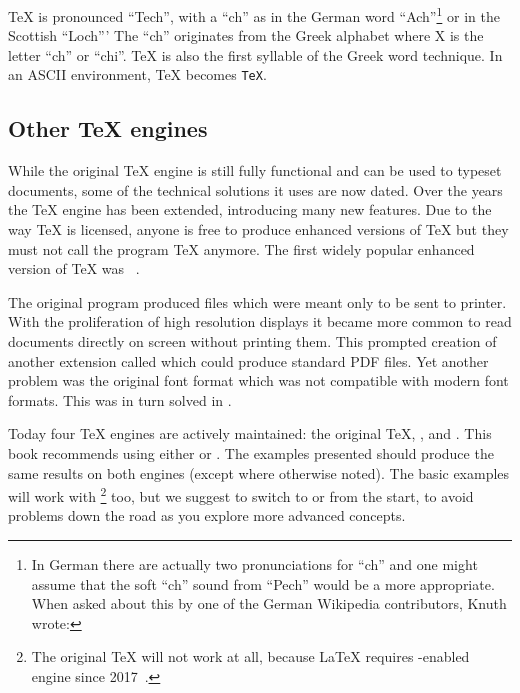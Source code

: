 \TeX{} is pronounced \enquote{Tech}, with a \enquote{ch} as in the German word
\enquote{Ach}\footnote{In German there are actually two pronunciations for
  \enquote{ch} and one might assume that the soft \enquote{ch} sound from
  \enquote{Pech} would be a more appropriate. When asked about this by one of the
  German Wikipedia contributors, Knuth wrote:
  } or in the
Scottish \enquote{Loch}' The \enquote{ch} originates from the Greek alphabet
where X is the letter \enquote{ch} or \enquote{chi}. \TeX{} is also the first
syllable of the Greek word technique. In an ASCII environment, \TeX{} becomes
\texttt{TeX}.

\subsection{Other \TeX{} engines}

While the original \TeX{} engine is still fully functional and can be used to
typeset documents, some of the technical solutions it uses are now dated. Over
the years the \TeX{} engine has been extended, introducing many new features.
Due to the way \TeX{} is licensed, anyone is free to produce enhanced versions
of \TeX{} but they must not call the program \TeX{} anymore. The first widely
popular enhanced version of \TeX{} was ~\cite{etex}.

The original program produced  files which were meant only to be sent
to printer. With the proliferation of high resolution displays it became more
common to read documents directly on screen without printing them. This
prompted creation of another extension called  which could
produce standard PDF files. Yet another problem was the original font format
which was not compatible with modern font formats. This was in turn solved in
.

Today four \TeX{} engines are actively maintained: the original \TeX{},
,  and . This book recommends using
either  or . The examples presented should produce
the same results on both engines (except where otherwise noted). The basic
examples will work with \footnote{The original \TeX{} will not
  work at all, because \LaTeX{} requires -enabled engine since
  2017~\cite{etex-kernel}.} too, but we suggest to switch to  or
 from the start, to avoid problems down the road as you explore
more advanced concepts.

